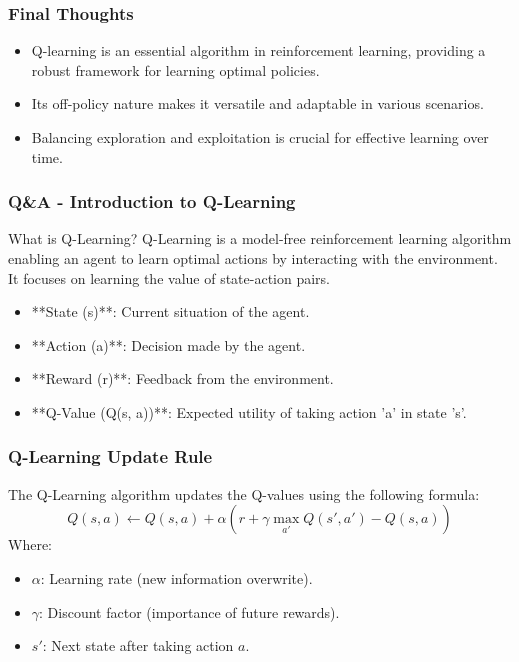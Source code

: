 \documentclass[aspectratio=169]{beamer}
\begin{document}
\begin{frame}
    \frametitle{Final Thoughts}
    \begin{itemize}
        \item Q-learning is an essential algorithm in reinforcement learning, providing a robust framework for learning optimal policies.
        \item Its off-policy nature makes it versatile and adaptable in various scenarios.
        \item Balancing exploration and exploitation is crucial for effective learning over time.
    \end{itemize}
\end{frame}

\begin{frame}[fragile]
    \frametitle{Q\&A - Introduction to Q-Learning}
    \begin{block}{What is Q-Learning?}
        Q-Learning is a model-free reinforcement learning algorithm enabling an agent to learn optimal actions by interacting with the environment. It focuses on learning the value of state-action pairs.
    \end{block}
    \begin{itemize}
        \item **State (s)**: Current situation of the agent.
        \item **Action (a)**: Decision made by the agent.
        \item **Reward (r)**: Feedback from the environment.
        \item **Q-Value (Q(s, a))**: Expected utility of taking action 'a' in state 's'.
    \end{itemize}
\end{frame}

\begin{frame}[fragile]
    \frametitle{Q-Learning Update Rule}
    The Q-Learning algorithm updates the Q-values using the following formula:
    \begin{equation}
    Q(s, a) \leftarrow Q(s, a) + \alpha \left( r + \gamma \max_{a'} Q(s', a') - Q(s, a) \right) 
    \end{equation}
    Where:
    \begin{itemize}
        \item \( \alpha \): Learning rate (new information overwrite).
        \item \( \gamma \): Discount factor (importance of future rewards).
        \item \( s' \): Next state after taking action \( a \).
    \end{itemize}
\end{frame}
\end{document}

